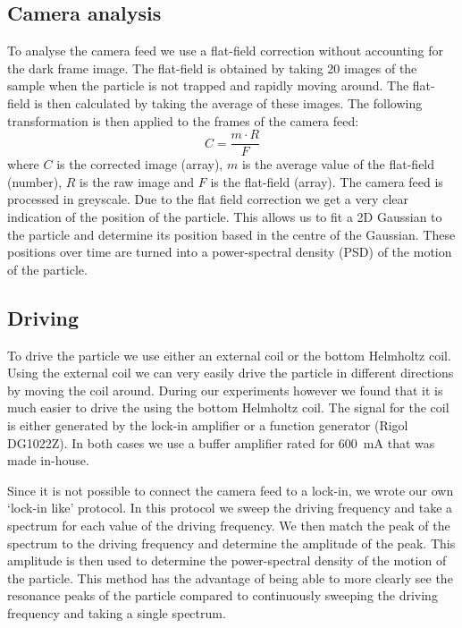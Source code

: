 \subsection{Camera analysis}
To analyse the camera feed we use a flat-field correction without accounting for the dark frame image. The flat-field is obtained by taking 20 images of the sample when the particle is not trapped and rapidly moving around. The flat-field is then calculated by taking the average of these images. The following transformation is then applied to the frames of the camera feed:
\begin{equation}
    C = \frac{m \cdot R}{F}
    \tag{flat-field correction}
    \label{eq:flat-field-correction}
\end{equation}
where $C$ is the corrected image (array), $m$ is the average value of the flat-field (number), $R$ is the raw image and $F$ is the flat-field (array). The camera feed is processed in greyscale. Due to the flat field correction we get a very clear indication of the position of the particle. This allows us to fit a 2D Gaussian to the particle and determine its position based in the centre of the Gaussian. These positions over time are turned into a power-spectral density (PSD) of the motion of the particle.

\subsection{Driving}
To drive the particle we use either an external coil or the bottom Helmholtz coil. Using the external coil we can very easily drive the particle in different directions by moving the coil around. During our experiments however we found that it is much easier to drive the \zmode using the bottom Helmholtz coil. The signal for the coil is either generated by the lock-in amplifier or a function generator (Rigol DG1022Z). In both cases we use a buffer amplifier rated for \qty{600}{\milli\ampere} that was made in-house.

Since it is not possible to connect the camera feed to a lock-in, we wrote our own `lock-in like' protocol. In this protocol we sweep the driving frequency and take a spectrum for each value of the driving frequency. We then match the peak of the spectrum to the driving frequency and determine the amplitude of the peak. This amplitude is then used to determine the power-spectral density of the motion of the particle. This method has the advantage of being able to more clearly see the resonance peaks of the particle compared to continuously sweeping the driving frequency and taking a single spectrum.
